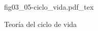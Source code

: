 \begin{figure}[h]
\centering
\def\svgwidth{0.5\textwidth}
{fig03_05-ciclo_vida.pdf_tex}
\caption{Teoría del ciclo de vida}
\label{fig03_05-ciclo_vida}
\end{figure}